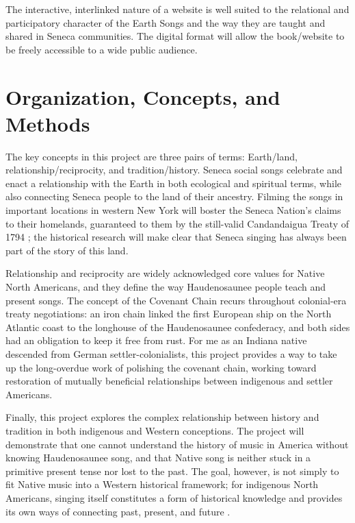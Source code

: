 \documentclass{neh}
\begin{document}
The interactive, interlinked nature of a website is well suited to the
relational and participatory character of the Earth Songs and the way they are
taught and shared in Seneca communities.
The digital format will allow the book/website to be freely 
accessible to a wide public audience.
\clearpage
\section{Organization, Concepts, and Methods}

The key concepts in this project are three pairs of terms: Earth/land,
relationship/reciprocity, and tradition/history.
Seneca social songs celebrate and enact a relationship with the Earth in both
ecological and spiritual terms, while also connecting Seneca people to the
land of their ancestry.
Filming the songs in important locations in western New York will boster
the Seneca Nation's claims to their homelands, guaranteed to them by
the still-valid Candandaigua Treaty of 1794
\Autocites{Deloria:BrokenTreaties}{BasicCall}; the historical research will
make clear that Seneca singing has always been part of the story of this land.

Relationship and reciprocity are widely acknowledged core values for Native
North Americans, and they define the way Haudenosaunee people teach and
present songs.
The concept of the Covenant Chain recurs throughout colonial-era treaty
negotiations: an iron chain linked the first European ship on the North
Atlantic coast to the longhouse of the Haudenosaunee confederacy, and both
sides had an obligation to keep it free from rust.
For me as an Indiana native descended from German settler-colonialists, this
project provides a way to take up the long-overdue work of polishing the
covenant chain, working toward restoration of mutually beneficial
relationships between indigenous and settler Americans. 

Finally, this project explores the complex relationship between history and
tradition in both indigenous and Western conceptions.
The project will demonstrate that one cannot understand the history of music
in America without knowing Haudenosaunee song, and that Native song is neither 
stuck in a primitive present tense nor lost to the past.
The goal, however, is not simply to fit Native music into a Western historical
framework; 
for indigenous North Americans, singing itself constitutes a form of
historical knowledge and provides its own ways of connecting past, present,
and future
\Autocite{Diamond:NativeAmericanHistory}.
\end{document}

